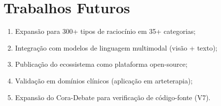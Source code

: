 \documentclass[12pt,a4paper,sumario=tradicional]{abntex2}
\begin{document}
\section{Trabalhos Futuros}

\begin{enumerate}
    \item Expansão para 300+ tipos de raciocínio em 35+ categorias;
    \item Integração com modelos de linguagem multimodal (visão + texto);
    \item Publicação do ecossistema como plataforma open-source;
    \item Validação em domínios clínicos (aplicação em arteterapia);
    \item Expansão do Cora-Debate para verificação de código-fonte (V7).
\end{enumerate}

\newpage


\end{document}
